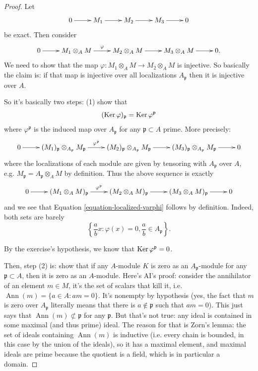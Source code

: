 \begin{proof}
Let
$$
\xymatrix{
0\ar[r]
&M_1\ar[r]
&M_2\ar[r]
&M_3\ar[r]
&0
}
$$
be exact. Then consider
$$
\xymatrix{
0\ar[r]
&M_1 \otimes_A M\ar[r]^{\varphi}
&M_2 \otimes_A M\ar[r]
&M_3 \otimes_A M\ar[r]
&0.
}
$$
We need to show that the map
$\varphi: M_1 \otimes_A M 
\to M_2 \otimes_A M$ is injective.
So basically the claim is:
if that map is injective
over all localizations $A_{\mathfrak{p}}$
then it is injective over $A$.

So it's basically two steps:
(1) show that
\begin{equation}
\label{equation-localized-varphi}
(\mathop{\mathrm{Ker}} \varphi)_{\mathfrak{p}}
=
\mathop{\mathrm{Ker}} \varphi^{\mathfrak{p}}
\end{equation}
where $\varphi^{\mathfrak{p}}$
is the induced map over $A_{\mathfrak{p}}$
for any $\mathfrak{p} \subset A$
prime. More precisely:
$$
\xymatrix{
0\ar[r]
&(M_1)_{\mathfrak{p}} 
\otimes_{A_{\mathfrak{p}}}M_{\mathfrak{p}}
\ar[r]^{
\varphi^{\mathfrak{p}}}
&
(M_2)_{\mathfrak{p}} 
\otimes_{A_{\mathfrak{p}}}
M_{\mathfrak{p}}\ar[r]
&(M_3)_{\mathfrak{p}}
\otimes_{A_{\mathfrak{p}}}
M_{\mathfrak{p}}\ar[r]
&0
}
$$
where the localizations of each module
are given by tensoring with $A_{\mathfrak{p}}$
over $A$, e.g. $M_{\mathfrak{p}} =
A_{\mathfrak{p}} \otimes_A M$ by definition.
Thus the above sequence is exactly
$$
\xymatrix{
0\ar[r]
&(M_1 \otimes_A M)_{\mathfrak{p}}\ar[r]
^{\varphi^{\mathfrak{p}}}
&(M_2 \otimes_A M)_{\mathfrak{p}}\ar[r]
&(M_3 \otimes_A M)_{\mathfrak{p}}\ar[r]
&0
}
$$
and we see that
Equation \ref{equation-localized-varphi}
follows by definition.
Indeed, both sets are barely
$$
\left\{
\frac{a}{b}x:\varphi(x)=0,
\frac{a}{b}\in A_{\mathfrak{p}}\right\}.
$$


By the exercise's hypothesis, we know that
$\mathop{\mathrm{Ker}} \varphi^{\mathfrak{p}}=0$.

Then, step (2) is:
show that if any $A$-module $K$
is zero as an $A_{\mathfrak{p}}$-module
for any $\mathfrak{p}\subset A$,
then it is zero as an $A$-module.
Here's AI's proof: consider the annihilator
of an element $m \in M$, it's the
set of scalars that kill it, i.e.
$\operatorname{Ann}(m) =
\{a \in A: am=0\}$. It's nonempty by
hypothesis (yes, the fact that $m$ is
zero over $A_{\mathfrak{p}}$ literally
means that there is $a \not\in \mathfrak{p}$
such that $a m =0$).
This just says that $\operatorname{Ann}(m)
\not\subset \mathfrak{p}$ for any
$\mathfrak{p}$.
But that's not true: any ideal is
contained in some maximal (and thus prime)
ideal. The reason for that is Zorn's lemma:
the set of ideals containing
$\operatorname{Ann}(m)$ is inductive
(i.e. every chain is bounded, in this case
by the union of the ideals), so it has
a maximal element, and maximal ideals
are prime because the quotient is a field,
which is in particular a domain.
 
\end{proof}

